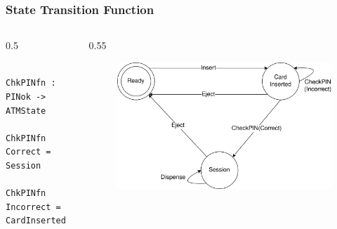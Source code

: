 \documentclass[compress]{beamer}
\begin{document}
\begin{frame}[fragile]
  \frametitle{State Transition Function}

  \begin{columns}
  \begin{column}{0.5\framewidth}
    \begin{verbatim}
      ChkPINfn : PINok -> ATMState
      ChkPINfn Correct = Session
      ChkPINfn Incorrect = CardInserted
    \end{verbatim}
  \end{column}
  \hspace*{-7mm}
  \begin{column}{0.55\framewidth}
    \begin{figure}
    \includegraphics[alt={The state diagram from slide 7.},width=\textwidth]{ATM.png}
    \end{figure}
  \end{column}
  \end{columns}

\end{frame}
\end{document}
